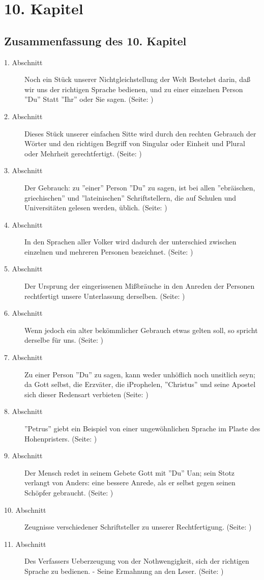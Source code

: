 

\chapter{10. Kapitel} \label{kap10}


\section{Zusammenfassung des 10. Kapitel}

\footnotesize
\begin{description}
\item[1. Abschnitt] Noch ein Stück unserer Nichtgleichstellung der Welt Bestehet
darin, daß wir uns der richtigen Sprache bedienen, und zu einer einzelnen Person
''Du'' Statt ''Ihr'' oder Sie sagen. (Seite: \pageref{kap10_ab1})
\item[2. Abschnitt] Dieses Stück unserer einfachen Sitte wird durch den rechten
Gebrauch der Wörter und den richtigen Begriff von Singular oder Einheit und
Plural oder Mehrheit gerechtfertigt. (Seite: \pageref{kap10_ab2})
\item[3. Abschnitt] Der Gebrauch: zu ''einer'' Person ''Du'' zu sagen, ist bei
allen ''ebräischen, griechischen'' und ''lateinischen'' Schriftstellern, die auf
Schulen und Universitäten gelesen werden, üblich. (Seite: \pageref{kap10_ab3})
\item[4. Abschnitt] In den Sprachen aller Volker wird dadurch der unterschied
zwischen einzelnen und mehreren Personen bezeichnet. (Seite: \pageref{kap10_ab4})
\item[5. Abschnitt] Der Ursprung der eingerissenen Mißbräuche in den Anreden der
Personen rechtfertigt unsere Unterlassung derselben. (Seite: \pageref{kap10_ab5})
\item[6. Abschnitt] Wenn jedoch ein alter bekömmlicher Gebrauch etwas gelten
soll, so spricht derselbe für uns. (Seite: \pageref{kap10_ab6})
\item[7. Abschnitt] Zu einer Person ''Du'' zu sagen, kann weder unhöflich noch
unsitlich seyn; da Gott selbst, die Erzväter, die iProphelen, ''Christus'' und
seine Apostel sich dieser Redensart verbieten (Seite: \pageref{kap10_ab7})
\item[8. Abschnitt] ''Petrus'' giebt ein Beispiel von einer ungewöhnlichen
Sprache im Plaste des Hohenpristers. (Seite: \pageref{kap10_ab8})
\item[9. Abschnitt] Der Mensch redet in seinem Gebete Gott mit ''Du'' Uan; sein
Stotz verlangt von Anders: eine bessere Anrede, als er selbst gegen seinen
Schöpfer gebraucht. (Seite: \pageref{kap10_ab9})
\item[10. Abschnitt] Zeugnisse verschiedener Schriftsteller zu unserer
Rechtfertigung. (Seite: \pageref{kap10_ab10})
\item[11. Abschnitt] Des Verfassers Ueberzeugung von der Nothwengigkeit, sich
der richtigen Sprache zu bedienen. - Seine Ermahnung an den Leser. (Seite: \pageref{kap10_ab11})


\end{description}
